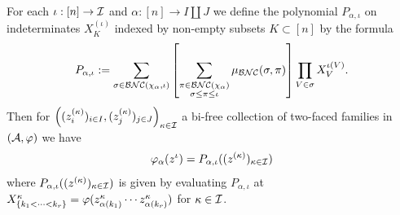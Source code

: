 \begin{proposition}
	For each $\iota : [n] \to \mathcal{I}$ and $\alpha : [n] \to I\coprod J$ we define the polynomial $P_{\alpha,\iota}$ on indeterminates $X^{(\iota)}_K$ indexed by non-empty subsets $K\subset [n]$ by the formula
	$$
	P_{\alpha,\iota} := \sum_{\sigma\in \mathcal{BNC}(\chi_\alpha,\iota)} \left[\sum_{\substack{\pi\in \mathcal{BNC}(\chi_\alpha)\\ \sigma\leq\pi\leq\iota}} \mu_{\mathcal{BNC}}(\sigma, \pi)\right] \prod_{V\in \sigma} X_V^{\iota(V)}.
	$$
	Then for $\left((z^{(\kappa)}_i)_{i\in I}, (z^{(\kappa)}_j)_{j\in J}\right)_{\kappa\in\mathcal{I}}$ a bi-free collection of two-faced families in $(\mathcal{A},\varphi)$ we have
	\begin{align*}
		\varphi_\alpha(z^\iota) = P_{\alpha,\iota}((z^{(\kappa)})_{\kappa\in\mathcal{I}})
	\end{align*}
	where $P_{\alpha,\iota}((z^{(\kappa)})_{\kappa\in\mathcal{I}})$ is given by evaluating $P_{\alpha,\iota}$ at $X_{\left\{k_1<\cdots<k_r\right\}}^{\kappa}=\varphi(z_{\alpha(k_1)}^\kappa\cdots z_{\alpha(k_r)}^\kappa)$ for $\kappa \in \mathcal{I}$.


\end{proposition}
